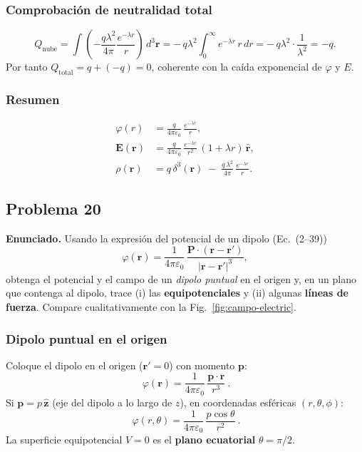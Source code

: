 \documentclass{article}
\begin{document}
\subsubsection*{Comprobación de neutralidad total}
\[
Q_{\text{nube}}=\int\!\left(-\frac{q\lambda^{2}}{4\pi}\frac{e^{-\lambda r}}{r}\right)\,d^{3}\mathbf r
= -\,q\lambda^{2}\int_{0}^{\infty} e^{-\lambda r}\,r\,dr
= -\,q\lambda^{2}\cdot \frac{1}{\lambda^{2}}=-q.
\]
Por tanto $Q_{\text{total}}=q+(-q)=0$, coherente con la caída exponencial de $\varphi$ y $E$.

\subsubsection*{Resumen}
\[
\boxed{
\begin{aligned}
\varphi(r)&=\frac{q}{4\pi\varepsilon_0}\,\frac{e^{-\lambda r}}{r},\\[4pt]
\mathbf E(\mathbf r)&=\frac{q}{4\pi\varepsilon_0}\,\frac{e^{-\lambda r}}{r^{2}}\,(1+\lambda r)\,\hat{\mathbf r},\\[4pt]
\rho(\mathbf r)&=q\,\delta^{3}(\mathbf r)\;-\;\frac{q\,\lambda^{2}}{4\pi}\,\frac{e^{-\lambda r}}{r}.
\end{aligned}}
\]


\subsection{Problema 20} \vspace{0.5cm}

\textbf{Enunciado.} Usando la expresión del potencial de un dipolo (Ec.~(2--39))
\[
\varphi(\mathbf r)=\frac{1}{4\pi\varepsilon_0}\,
\frac{\mathbf P\cdot(\mathbf r-\mathbf r')}{\lvert \mathbf r-\mathbf r'\rvert^{3}},
\]
obtenga el potencial y el campo de un \emph{dipolo puntual} en el origen y, en un plano que contenga al dipolo, trace (i) las \textbf{equipotenciales} y (ii) algunas \textbf{líneas de fuerza}. Compare cualitativamente con la Fig.~\ref{fig:campo-electric}. \vspace{0.2cm}

\subsubsection*{Dipolo puntual en el origen}
Coloque el dipolo en el origen ($\mathbf r'=0$) con momento $\mathbf p$:
\[
\boxed{\ \varphi(\mathbf r)=\frac{1}{4\pi\varepsilon_0}\,\frac{\mathbf p\cdot\mathbf r}{r^{3}} \ }.
\]
Si $\mathbf p=p\,\hat{\mathbf z}$ (eje del dipolo a lo largo de $z$), en coordenadas esféricas $(r,\theta,\phi)$:
\[
\boxed{\ \varphi(r,\theta)=\frac{1}{4\pi\varepsilon_0}\,\frac{p\cos\theta}{r^{2}} \ }.
\]
La superficie equipotencial $V=0$ es el \textbf{plano ecuatorial} $\theta=\pi/2$.
\end{document}
